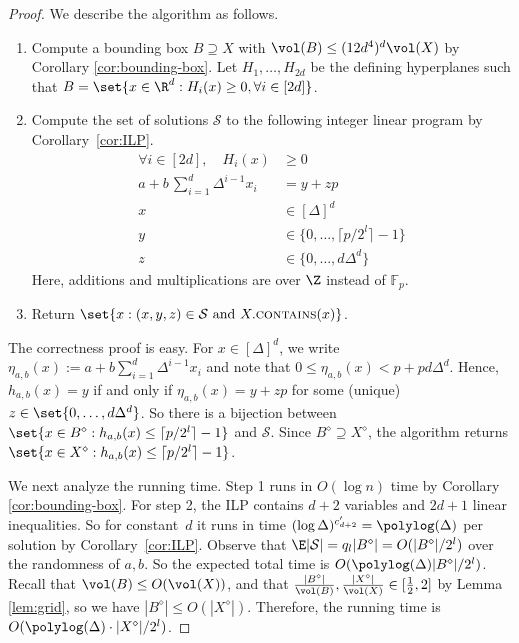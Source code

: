 \documentclass[a4paper, 11pt]{article}
\newcommand{\contains}{\textsc{contains}}
\newcommand{\F}{\mathbb{F}}
\newcommand{\class}[1]{\mathcal{#1}}
\newcommand{\discrete}[1]{#1^\diamond}
\begin{document}
\begin{proof}
    We describe the algorithm  as follows.
    \begin{enumerate}
        \item Compute a bounding box $B \supseteq X$ with $\vol(B) \leq (12d^4)^d \vol(X)$ by Corollary \ref{cor:bounding-box}. Let $H_1, \dots, H_{2d}$ be the defining hyperplanes such that $B = \set{x \in \R^d : H_i(x) \geq 0, \forall i \in [2d]}$.
        
        \item Compute the set of solutions $\class{S}$ to the following integer linear program by Corollary~\ref{cor:ILP}.
        \begin{align*}
            \forall i \in [2d], \quad H_i(x) &\geq 0 \quad \\
            a + b\,\sum_{i=1}^d \Delta^{i-1} x_i &= y + zp \\
            x &\in [\Delta]^d \\
            y &\in \{0, \dots, \lceil p/2^l \rceil - 1\} \\
            z &\in \{0, \dots, d\Delta^d\}
        \end{align*}
        Here, additions and multiplications are over $\Z$ instead of $\F_p$.
        
        \item Return $\set{x : (x,y,z) \in \class{S} \text{ and } X.\contains(x)}$.
    \end{enumerate}
    
    The correctness proof is easy. For $x \in [\Delta]^d$, we write $\eta_{a,b}(x) := a + b \sum_{i=1}^d \Delta^{i-1} x_i$ and note that $0 \leq \eta_{a,b}(x) < p + pd\Delta^d$. Hence, $h_{a,b}(x) = y$ if and only if $\eta_{a,b}(x) = y+zp$ for some (unique) $z \in \set{0, \dots, d\Delta^d}$. So there is a bijection between $\set{x \in \discrete{B} : h_{a,b}(x) \leq \lceil p/2^l \rceil - 1}$ and $\class{S}$. Since $\discrete{B} \supseteq \discrete{X}$, the algorithm returns $\set{x \in \discrete{X} : h_{a,b}(x) \leq \lceil p/2^l \rceil - 1}$.
    
    We next analyze the running time. Step 1 runs in $O(\log n)$ time by Corollary \ref{cor:bounding-box}. For step 2, the ILP contains $d+2$ variables and $2d+1$ linear inequalities. So for constant~$d$ it runs in time $(\log \Delta)^{c_{d+2}'} = \polylog(\Delta)$ per solution by Corollary~\ref{cor:ILP}. Observe that $\E |\class{S}| = q_l |\discrete{B}| = O(|\discrete{B}|/2^l)$ over the randomness of $a,b$. So the expected total time is $O(\polylog(\Delta) |\discrete{B}| / 2^l)$. Recall that $\vol(B) \leq O(\vol(X))$, and that $\frac{|\discrete{B}|}{\vol(B)}, \frac{|\discrete{X}|}{\vol(X)} \in [\frac{1}{2}, 2]$ by Lemma \ref{lem:grid}, so we have $|\discrete{B}| \leq O(|\discrete{X}|)$. Therefore, the running time is $O(\polylog(\Delta) \cdot |\discrete{X}|/2^l)$.
\end{proof}
\end{document}
